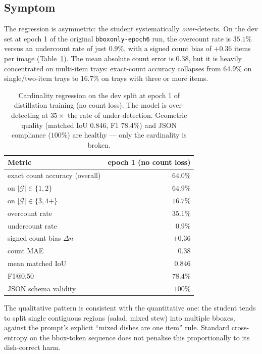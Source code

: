 \subsection{Symptom}

The regression is asymmetric: the student systematically \emph{over}-detects.
On the dev set at epoch 1 of the original \texttt{bboxonly-epoch6} run, the
overcount rate is $35.1\%$ versus an undercount rate of just $0.9\%$, with
a signed count bias of $+0.36$ items per image (Table~\ref{tab:card-bias}).
The mean absolute count error is $0.38$, but it is heavily concentrated on
multi-item trays: exact-count accuracy collapses from $64.9\%$ on
single/two-item trays to $16.7\%$ on trays with three or more items.

\begin{table}[t]
\centering\small
\begin{tabular}{l r}
\toprule
\textbf{Metric} & \textbf{epoch 1 (no count loss)} \\
\midrule
exact count accuracy (overall)              & $64.0\%$ \\
\quad on $|\mathcal{G}| \in \{1, 2\}$       & $64.9\%$ \\
\quad on $|\mathcal{G}| \in \{3, 4{+}\}$    & $16.7\%$ \\
overcount rate                              & $35.1\%$ \\
undercount rate                             & $0.9\%$ \\
signed count bias $\Delta n$                & $+0.36$ \\
count MAE                                   & $0.38$ \\
mean matched IoU                            & $0.846$ \\
F1@0.50                                     & $78.4\%$ \\
JSON schema validity                        & $100\%$ \\
\bottomrule
\end{tabular}
\caption{Cardinality regression on the dev split at epoch 1 of distillation
training (no count loss). The model is over-detecting at $35\times$ the rate
of under-detection. Geometric quality (matched IoU $0.846$, F1 $78.4\%$) and
JSON compliance ($100\%$) are healthy --- only the cardinality is broken.}
\label{tab:card-bias}
\end{table}

The qualitative pattern is consistent with the quantitative one: the
student tends to split single contiguous regions (salad, mixed stew) into
multiple bboxes, against the prompt's explicit ``mixed dishes are one
item'' rule. Standard cross-entropy on the bbox-token sequence does not
penalise this proportionally to its dish-correct harm.

